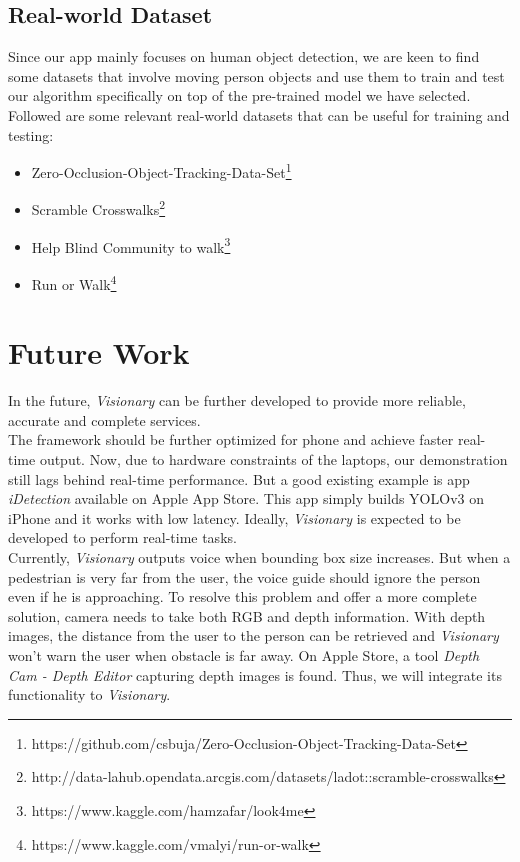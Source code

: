 \documentclass[letterpaper]{article} %
\begin{document}
\subsection{Real-world Dataset}
Since our app mainly focuses on human object detection, we are keen to find some datasets that involve moving person objects and use them to train and test our algorithm specifically on top of the pre-trained model we have selected. Followed are some relevant real-world datasets that can be useful for training and testing:
\begin{itemize}
    \item Zero-Occlusion-Object-Tracking-Data-Set\footnote{https://github.com/csbuja/Zero-Occlusion-Object-Tracking-Data-Set}
    \item Scramble Crosswalks\footnote{http://data-lahub.opendata.arcgis.com/datasets/ladot::scramble-crosswalks}
    \item Help Blind Community to walk\footnote{https://www.kaggle.com/hamzafar/look4me}
    \item Run or Walk\footnote{https://www.kaggle.com/vmalyi/run-or-walk}
\end{itemize}

\section{Future Work}
In the future, \textit{Visionary} can be further developed to provide more reliable, accurate and complete services.\\

\noindent The framework should be further optimized for phone and achieve faster real-time output. Now, due to hardware constraints of the laptops, our demonstration still lags behind real-time performance. But a good existing example is app \textit{iDetection} available on Apple App Store. This app simply builds YOLOv3 on iPhone and it works with low latency. Ideally, \textit{Visionary} is expected to be developed to perform real-time tasks.\\ 

\noindent Currently, \textit{Visionary} outputs voice when bounding box size increases. But when a pedestrian is very far from the user, the voice guide should ignore the person even if he is approaching. To resolve this problem and offer a more complete solution, camera needs to take both RGB and depth information. With depth images, the distance from the user to the person can be retrieved and \textit{Visionary} won't warn the user when obstacle is far away. On Apple Store, a tool \textit{Depth Cam - Depth Editor} capturing depth images is found. Thus, we will integrate its functionality to \textit{Visionary}.
\end{document}
